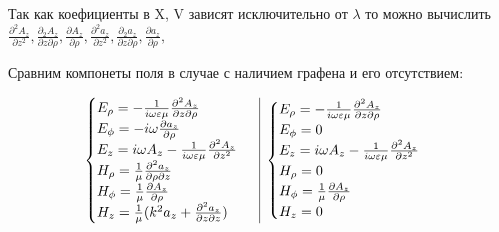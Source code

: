 	Так как коефициенты в X, V зависят исключительно от $\lambda$ то можно вычислить $\frac{\partial^2 A_z}{\partial z^2}, \frac{\partial_2 A_z}{\partial z \partial \rho}, \frac{\partial A_z}{\partial \rho}, \frac{\partial^2 a_z}{\partial z^2}, \frac{\partial_2 a_z}{\partial z \partial \rho}, \frac{\partial a_z}{\partial \rho}, $
	
	Сравним компонеты поля в случае с наличием графена и его отсутствием:
	
	\begin{equation}
		\begin{array}{c|c}
			\begin{aligned}
				\begin{cases}
					$$E_{\rho} = -\frac{1}{i \omega \varepsilon \mu} \frac{\partial^2 A_z}{\partial z \partial \rho}$$ \\
					$$E_{\phi} = - i \omega \frac{\partial a_z}{\partial \rho}$$ \\
					$$E_z = i \omega A_z - \frac{1}{i \omega \varepsilon \mu} \frac{\partial^2 A_z}{\partial z^2}$$ \\
					$$H_{\rho} = \frac{1}{\mu} \frac{\partial^2 a_z}{\partial \rho \partial z}$$ \\
					$$H_{\phi} = \frac{1}{\mu} \frac{\partial A_z}{\partial \rho}$$ \\
					$$H_{z} = \frac{1}{\mu}(k^2 a_z +  \frac{\partial^2 a_z}{\partial z \partial z})$$ \\
					
					
					
				\end{cases}
			\end{aligned}
			&
			\begin{aligned}
				\begin{cases}
					$$E_{\rho} = -\frac{1}{i \omega \varepsilon \mu} \frac{\partial^2 A_z}{\partial z \partial \rho}$$ \\
					$$E_{\phi} = 0$$ \\
					$$E_z = i \omega A_z - \frac{1}{i \omega \varepsilon \mu} \frac{\partial^2 A_z}{\partial z^2}$$ \\
					$$H_{\rho} = 0$$ \\
					$$H_{\phi} = \frac{1}{\mu} \frac{\partial A_z}{\partial \rho}$$ \\
					$$H_{z} = 0$$ \\
					
					
					
				\end{cases}
			\end{aligned}
			
		\end{array}
	\end{equation}
	
